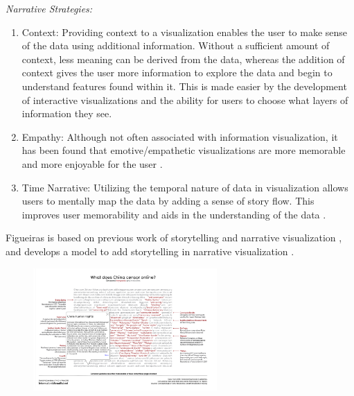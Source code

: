 \documentclass{egpubl}
\begin{document}
\textit{Narrative Strategies:} 
\begin{enumerate}
\item Context: Providing context to a visualization enables the user to make sense of the data using additional information. Without a sufficient amount of context, less meaning can be derived from the data, whereas the addition of context gives the user more information to explore the data and begin to understand features found within it. This is made easier by the development of interactive visualizations and the ability for users to choose what layers of information they see. 
\item Empathy: Although not often associated with information visualization, it has been found that emotive/empathetic visualizations are more memorable and more enjoyable for the user \cite{Kosara}.
\item Time Narrative: Utilizing the temporal nature of data in visualization allows users to mentally map the data by adding a sense of story flow. This improves user memorability and aids in the understanding of the data \cite{Kosara}.
		
\end{enumerate}
Figueiras is based on previous work of storytelling \cite{hullman}\cite{sci}\cite{segal} and narrative visualization \cite{fisher}, and develops a model to add storytelling in narrative visualization \cite{figueiras}.

\begin{figure}
\begingroup
\centering
\includegraphics[width=7cm]{./images/figueiras14narrative}
\label{fig:figueiras14narrative}
\endgroup
\end{figure}
\end{document}
